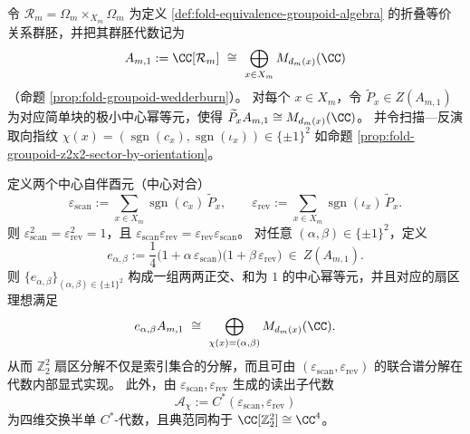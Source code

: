 \begin{theorem}\label{thm:fold-groupoid-z2x2-central-idempotents}
令 \(\mathcal{R}_m=\Omega_m\times_{X_m}\Omega_m\) 为定义 \ref{def:fold-equivalence-groupoid-algebra} 的折叠等价关系群胚，并把其群胚代数记为
\[
A_{m,1}:=\CC[\mathcal{R}_m]\ \cong\ \bigoplus_{x\in X_m}M_{d_m(x)}(\CC)
\]
（命题 \ref{prop:fold-groupoid-wedderburn}）。
对每个 \(x\in X_m\)，令 \(\widetilde P_x\in Z(A_{m,1})\) 为对应简单块的极小中心幂等元，使得
\(
\widetilde P_x A_{m,1}\cong M_{d_m(x)}(\CC)
\)。
并令扫描—反演取向指纹
\(
\chi(x)=(\operatorname{sgn}(c_x),\operatorname{sgn}(\iota_x))\in\{\pm1\}^2
\)
如命题 \ref{prop:fold-groupoid-z2x2-sector-by-orientation}。
\par
定义两个中心自伴酉元（中心对合）
\[
\varepsilon_{\mathrm{scan}}:=\sum_{x\in X_m}\operatorname{sgn}(c_x)\,\widetilde P_x,
\qquad
\varepsilon_{\mathrm{rev}}:=\sum_{x\in X_m}\operatorname{sgn}(\iota_x)\,\widetilde P_x.
\]
则 \(\varepsilon_{\mathrm{scan}}^2=\varepsilon_{\mathrm{rev}}^2=1\)，且 \(\varepsilon_{\mathrm{scan}}\varepsilon_{\mathrm{rev}}=\varepsilon_{\mathrm{rev}}\varepsilon_{\mathrm{scan}}\)。
对任意 \((\alpha,\beta)\in\{\pm1\}^2\)，定义
\[
e_{\alpha,\beta}
:=
\frac14\bigl(1+\alpha\,\varepsilon_{\mathrm{scan}}\bigr)\bigl(1+\beta\,\varepsilon_{\mathrm{rev}}\bigr)
\ \in\ Z(A_{m,1}).
\]
则 \(\{e_{\alpha,\beta}\}_{(\alpha,\beta)\in\{\pm1\}^2}\) 构成一组两两正交、和为 \(1\) 的中心幂等元，并且对应的扇区理想满足
\[
e_{\alpha,\beta}A_{m,1}
\ \cong\
\bigoplus_{\chi(x)=(\alpha,\beta)}M_{d_m(x)}(\CC).
\]
从而 \(\mathbb Z_2^2\) 扇区分解不仅是索引集合的分解，而且可由 \((\varepsilon_{\mathrm{scan}},\varepsilon_{\mathrm{rev}})\) 的联合谱分解在代数内部显式实现。
此外，由 \(\varepsilon_{\mathrm{scan}},\varepsilon_{\mathrm{rev}}\) 生成的读出子代数
\[
\mathcal A_\chi:=C^\ast(\varepsilon_{\mathrm{scan}},\varepsilon_{\mathrm{rev}})
\]
为四维交换半单 \(C^\ast\)-代数，且典范同构于 \(\CC[\mathbb Z_2^2]\cong \CC^4\)。
\end{theorem}

